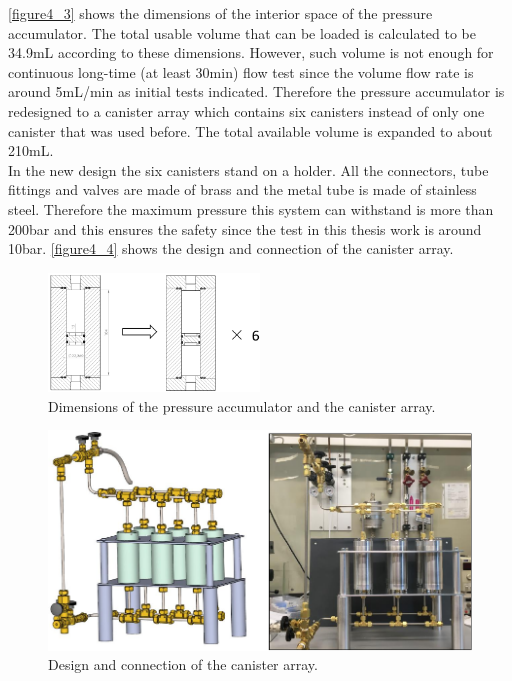 \autoref{figure4_3} shows the dimensions of the interior space of the pressure accumulator. The total usable volume that can be loaded is calculated to be 34.9mL according to these dimensions. However, such volume is not enough for continuous long-time (at least 30min) flow test since the volume flow rate is around 5mL/min as initial tests indicated. Therefore the pressure accumulator is redesigned to a canister array which contains six canisters instead of only one canister that was used before. The total available volume is expanded to about 210mL. \\

In the new design the six canisters stand on a holder. All the connectors, tube fittings and valves are made of brass and the metal tube is made of stainless steel. Therefore the maximum pressure this system can withstand is more than 200bar and this ensures the safety since the test in this thesis work is around 10bar. \autoref{figure4_4} shows the design and connection of the canister array.\\

\begin{figure}[ht]%
\centering
\includegraphics[width=0.5\textwidth]{figures/packagingandtestunderhighpressure/figure4_3}%
\caption{Dimensions of the pressure accumulator and the canister array.}%
\label{figure4_3}%
\end{figure}

\begin{figure}[ht]%
\centering
\includegraphics[width=1\textwidth]{figures/packagingandtestunderhighpressure/figure4_4}%
\caption{Design and connection of the canister array.}%
\label{figure4_4}%
\end{figure}
\clearpage


